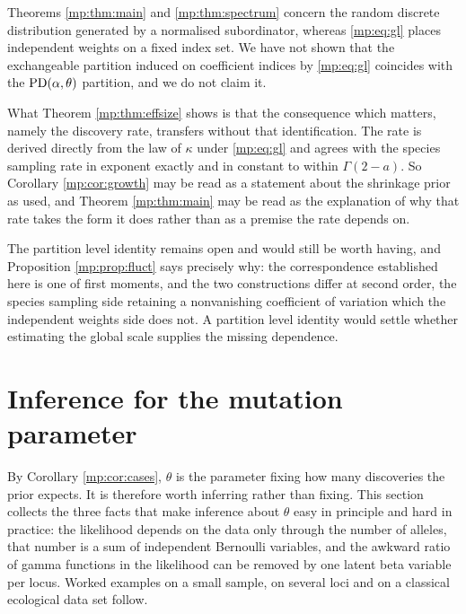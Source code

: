 \begin{remark}
\label{mp:rem:open}
Theorems \ref{mp:thm:main} and \ref{mp:thm:spectrum} concern the random discrete distribution
generated by a normalised subordinator, whereas \eqref{mp:eq:gl} places independent weights on a
fixed index set. We have not shown that the exchangeable partition induced on coefficient
indices by \eqref{mp:eq:gl} coincides with the $\mathrm{PD}(\alpha,\theta)$ partition, and we do not
claim it.

What Theorem \ref{mp:thm:effsize} shows is that the consequence which matters, namely the
discovery rate, transfers without that identification. The rate is derived directly from the
law of $\kappa$ under \eqref{mp:eq:gl} and agrees with the species sampling rate in exponent
exactly and in constant to within $\Gamma(2-a)$. So Corollary \ref{mp:cor:growth} may be read as
a statement about the shrinkage prior as used, and Theorem \ref{mp:thm:main} may be read as the
explanation of why that rate takes the form it does rather than as a premise the rate depends
on.

The partition level identity remains open and would still be worth having, and Proposition
\ref{mp:prop:fluct} says precisely why: the correspondence established here is one of first
moments, and the two constructions differ at second order, the species sampling side
retaining a nonvanishing coefficient of variation which the independent weights side does
not. A partition level identity would settle whether estimating the global scale supplies the
missing dependence.
\end{remark}

\section{Inference for the mutation parameter}
\label{mp:sec:conj}

By Corollary \ref{mp:cor:cases}, $\theta$ is the parameter fixing how many discoveries the
prior expects. It is therefore worth inferring rather than fixing. This section collects the
three facts that make inference about $\theta$ easy in principle and hard in practice:
the likelihood depends on the data only through the number of alleles, that number is a sum
of independent Bernoulli variables, and the awkward ratio of gamma functions in the
likelihood can be removed by one latent beta variable per locus. Worked examples on a small
sample, on several loci and on a classical ecological data set follow.

